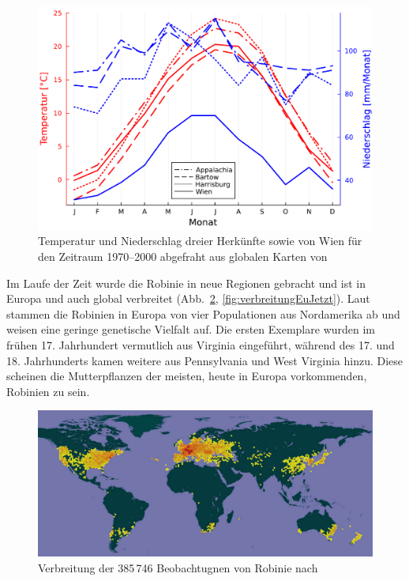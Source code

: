 \documentclass[twocolumn]{scrartcl}
\begin{document}
\begin{figure}[htbp]
  \centering
  \includegraphics[width=.9\linewidth]{./bild/wetter}
  \caption{Temperatur und Niederschlag dreier Herkünfte sowie von Wien für den
  Zeitraum 1970--2000 abgefraht aus globalen Karten von \citet{worldclim2017}}
  \label{fig:wetter}
\end{figure}

Im Laufe der Zeit wurde die Robinie in neue Regionen gebracht und ist in Europa und auch global verbreitet (Abb.~\ref{fig:verbreitungGlob}, \ref{fig:verbreitungEuJetzt}). Laut \citet{bouteiller2019robinie} stammen die Robinien in Europa von vier Populationen aus Nordamerika ab und weisen eine geringe genetische Vielfalt auf. Die ersten Exemplare wurden im frühen 17. Jahrhundert vermutlich aus Virginia eingeführt, während des 17. und 18. Jahrhunderts kamen weitere aus Pennsylvania und West Virginia hinzu. Diese scheinen die Mutterpflanzen der meisten, heute in Europa vorkommenden, Robinien zu sein.

\begin{figure}[htbp]
  \centering
  \includegraphics[width=.9\linewidth]{./bild/verbreitungRobGlob}
  \caption{Verbreitung der 385\,746 Beobachtugnen von Robinie nach \citet{gbifRob}}
  \label{fig:verbreitungGlob}
\end{figure}
\end{document}
